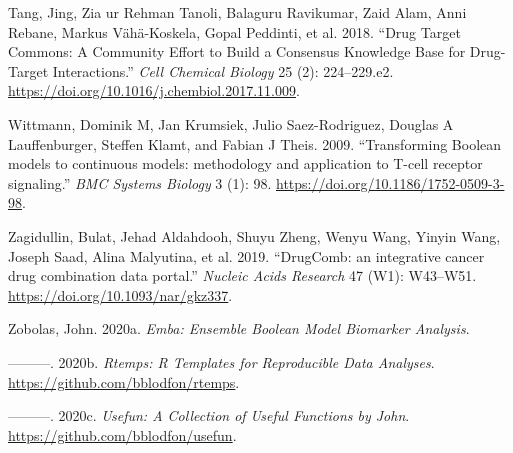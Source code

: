 \documentclass[
  12pt,
]{book}
\newlength{\cslhangindent}
\newenvironment{cslreferences}%
  {\setlength{\parindent}{0pt}%
  \everypar{\setlength{\hangindent}{\cslhangindent}}\ignorespaces}%
  {\par}
\begin{document}
\begin{cslreferences}
\leavevmode\hypertarget{ref-Tang2018}{}%
Tang, Jing, Zia ur Rehman Tanoli, Balaguru Ravikumar, Zaid Alam, Anni Rebane, Markus Vähä-Koskela, Gopal Peddinti, et al. 2018. ``Drug Target Commons: A Community Effort to Build a Consensus Knowledge Base for Drug-Target Interactions.'' \emph{Cell Chemical Biology} 25 (2): 224--229.e2. \url{https://doi.org/10.1016/j.chembiol.2017.11.009}.

\leavevmode\hypertarget{ref-Wittmann2009}{}%
Wittmann, Dominik M, Jan Krumsiek, Julio Saez-Rodriguez, Douglas A Lauffenburger, Steffen Klamt, and Fabian J Theis. 2009. ``Transforming Boolean models to continuous models: methodology and application to T-cell receptor signaling.'' \emph{BMC Systems Biology} 3 (1): 98. \url{https://doi.org/10.1186/1752-0509-3-98}.

\leavevmode\hypertarget{ref-Zagidullin2019}{}%
Zagidullin, Bulat, Jehad Aldahdooh, Shuyu Zheng, Wenyu Wang, Yinyin Wang, Joseph Saad, Alina Malyutina, et al. 2019. ``DrugComb: an integrative cancer drug combination data portal.'' \emph{Nucleic Acids Research} 47 (W1): W43--W51. \url{https://doi.org/10.1093/nar/gkz337}.

\leavevmode\hypertarget{ref-R-emba}{}%
Zobolas, John. 2020a. \emph{Emba: Ensemble Boolean Model Biomarker Analysis}.

\leavevmode\hypertarget{ref-R-rtemps}{}%
---------. 2020b. \emph{Rtemps: R Templates for Reproducible Data Analyses}. \url{https://github.com/bblodfon/rtemps}.

\leavevmode\hypertarget{ref-R-usefun}{}%
---------. 2020c. \emph{Usefun: A Collection of Useful Functions by John}. \url{https://github.com/bblodfon/usefun}.
\end{cslreferences}
\end{document}
